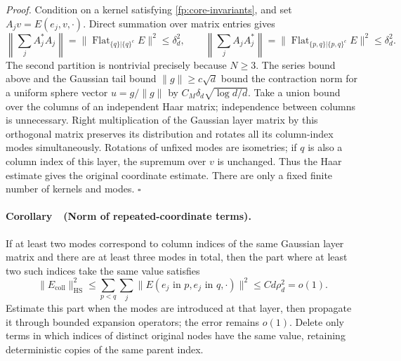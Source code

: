 \documentclass[a4paper]{tufte-handout}
\begin{document}
\begin{fullwidth}
\emph{Proof.}
Condition on a kernel satisfying \eqref{fp:core-invariants}, and set
$A_jv=E(e_j,v,\cdot)$. Direct summation over matrix entries gives
\[
 \left\|\sum_jA_j^*A_j\right\|
 =\|\operatorname{Flat}_{\{q\}|\{q\}^c}E\|^2\leq\delta_d^2,
 \qquad
 \left\|\sum_jA_jA_j^*\right\|
 =\|\operatorname{Flat}_{\{p,q\}|\{p,q\}^c}E\|^2\leq\delta_d^2.
\]
The second partition is nontrivial precisely because $N\geq3$. The series bound above and
the Gaussian tail bound $\|g\|\geq c\sqrt d$ bound the contraction norm for a uniform sphere vector $u=g/\|g\|$
by $C_M\delta_d\sqrt{\log d/d}$.
Take a union bound over the columns of an independent Haar matrix; independence between columns is unnecessary.
Right multiplication of the Gaussian layer matrix by this orthogonal matrix preserves its distribution and rotates all its column-index modes simultaneously.
Rotations of unfixed modes are isometries; if $q$ is also a column index of this layer, the supremum over $v$ is unchanged.
Thus the Haar estimate gives the original coordinate estimate. There are only a fixed finite number of kernels and modes.
\hfill$\square$

\paragraph{Corollary~\thelemma\ (Norm of repeated-coordinate terms).}
\label{fp:core-collision}
If at least two modes correspond to column indices of the same Gaussian layer matrix and there are at least three modes in total, then the part where at least two such indices take the same value satisfies
\begin{equation}
 \|E_{\mathrm{coll}}\|_{\mathrm{HS}}^2
 \leq\sum_{p<q}\sum_j\|E(e_j\text{ in }p,e_j\text{ in }q,\cdot)\|^2
 \leq C d\rho_d^2=o(1).
 \label{fp:core-collision-bound}
\end{equation}
Estimate this part when the modes are introduced at that layer, then propagate it through bounded expansion operators; the error remains $o(1)$.
Delete only terms in which indices of distinct original nodes have the same value, retaining deterministic copies of the same parent index.


\end{fullwidth}
\end{document}
